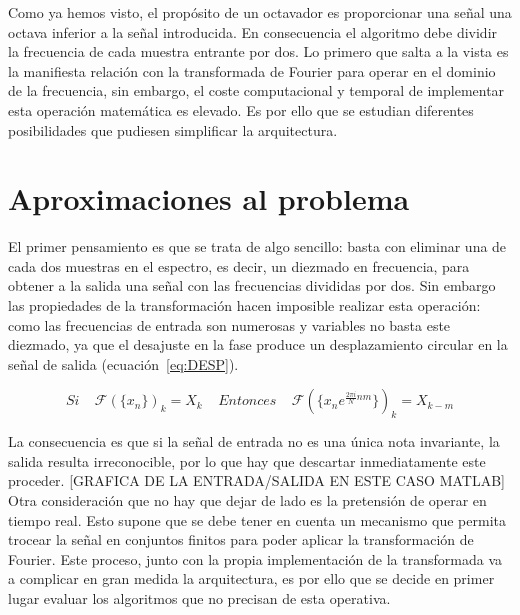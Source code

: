 Como ya hemos visto, el propósito de un octavador es proporcionar una señal una octava inferior a la señal introducida. En consecuencia el algoritmo debe dividir la frecuencia de cada muestra entrante por dos. Lo primero que salta a la vista es la manifiesta relación con la transformada de Fourier para operar en el dominio de la frecuencia, sin embargo, el coste computacional y temporal de implementar esta operación matemática es elevado. Es por ello que se estudian diferentes posibilidades que pudiesen simplificar la arquitectura.

\section{Aproximaciones al problema}
El primer pensamiento es que se trata de algo sencillo: basta con eliminar una de cada dos muestras en el espectro, es decir, un diezmado en frecuencia, para obtener a la salida una señal con las frecuencias divididas por dos. Sin embargo las propiedades de la transformación hacen imposible realizar esta operación: como las frecuencias de entrada son numerosas y variables no basta este diezmado, ya que el desajuste en la fase produce un desplazamiento circular en la señal de salida (ecuación~\ref{eq:DESP}). 

\begin{equation}
\label{eq:DESP}
Si~~~~~\mathscr{F}(\{x_{n}\})_{k} = X_{k}~~~~~Entonces~~~~~\mathscr{F}(\{x_{n}e^{\frac{2\pi i}{N}nm}\})_{k}= X_{k-m} 
\end{equation}

La consecuencia es que si la señal de entrada no es una única nota invariante, la salida resulta irreconocible, por lo que  hay que descartar inmediatamente este proceder. [GRAFICA DE LA ENTRADA/SALIDA EN ESTE CASO MATLAB] Otra consideración que no hay que dejar de lado es la pretensión de operar en tiempo real. Esto supone que se debe tener en cuenta un mecanismo que permita trocear la señal en conjuntos finitos para poder aplicar la transformación de Fourier. Este proceso, junto con la propia implementación de la transformada va a complicar en gran medida la arquitectura, es por ello que se decide en primer lugar evaluar los algoritmos que no precisan de esta operativa.

